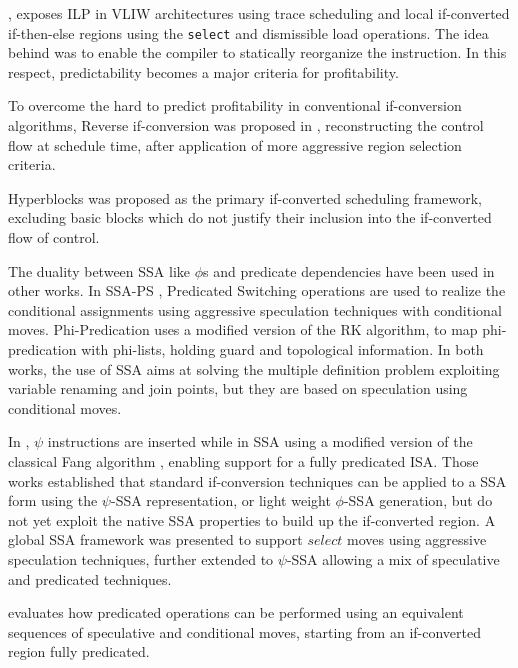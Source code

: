 \cite{Rau:2003:EoCS}, exposes ILP in VLIW architectures using trace scheduling and local if-converted if-then-else regions using the \texttt{select} and dismissible load operations. The idea behind was to enable the compiler to statically reorganize the instruction. In this respect, predictability \cite{Fisher:1992:PCB:143371.143493} becomes a major criteria for profitability.

To overcome the hard to predict profitability in conventional if-conversion algorithms, Reverse if-conversion was proposed in \cite{August:1999:PRI:326224.325595}, reconstructing the control flow at schedule time, after application of more aggressive region selection criteria.

Hyperblocks \cite{Mahlke:1992:ECS:144965.144998} was proposed as the primary if-converted scheduling framework, excluding basic blocks which do not justify their inclusion into the if-converted flow of control.

The duality between SSA like $\phi$s and predicate dependencies have been used in other works. In SSA-PS \cite{Jacome01clusteredvliw}, Predicated Switching operations are used to realize the conditional assignments using aggressive speculation techniques with conditional moves. Phi-Predication \cite{Chuang03phi-predicationfor} uses a modified version of the RK algorithm, to map phi-predication with phi-lists, holding guard and topological information. In both works, the use of SSA aims at solving the multiple definition problem exploiting variable renaming and join points, but they are based on speculation using conditional moves. 

In \cite{Stoutchinin:2004:EuroPar}, $\psi$ instructions are inserted while in SSA using a modified version of the classical Fang algorithm \cite{Fang:1996:CAI:645674.663446}, enabling support for a fully predicated ISA.
Those works established that standard if-conversion techniques can be applied to a SSA form using the $\psi$-SSA representation, or light weight $\phi$-SSA generation, but do not yet exploit the native SSA properties to build up the if-converted region.
A global SSA framework was presented \cite{odes_bruel} to support $select$ moves using aggressive speculation techniques, further extended to $\psi$-SSA \cite{ijes_bruel} allowing a mix of speculative and predicated techniques.

\cite{Mahlke95acomparison} evaluates how predicated operations can be performed using an equivalent sequences of speculative and conditional moves, starting from an if-converted region fully predicated. 










